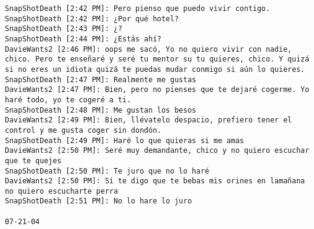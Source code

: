\begin{verbatim}
SnapShotDeath [2:42 PM]: Pero pienso que puedo vivir contigo. 
SnapShotDeath [2:42 PM]: ¿Por qué hotel? 
SnapShotDeath [2:43 PM]: ¿? 
SnapShotDeath [2:44 PM]: ¿Estás ahí? 
DavieWants2 [2:46 PM]: oops me sacó, Yo no quiero vivir con nadie, chico. Pero te enseñaré y seré tu mentor su tu quieres, chico. Y quizá si no eres un idiota quizá te puedas mudar conmigo si aún lo quieres. 
SnapShotDeath [2:47 PM]: Realmente me gustas 
DavieWants2 [2:47 PM]: Bien, pero no pienses que te dejaré cogerme. Yo haré todo, yo te cogeré a ti. 
SnapShotDeath [2:48 PM]: Me gustan los besos 
DavieWants2 [2:49 PM]: Bien, llévatelo despacio, prefiero tener el control y me gusta coger sin dondón. 
SnapShotDeath [2:49 PM]: Haré lo que quieras si me amas 
DavieWants2 [2:50 PM]: Seré muy demandante, chico y no quiero escuchar que te quejes 
SnapShotDeath [2:50 PM]: Te juro que no lo haré 
DavieWants2 [2:50 PM]: Si te digo que te bebas mis orines en lamañana no quiero escucharte perra 
SnapShotDeath [2:51 PM]: No lo hare lo juro

07-21-04


\end{verbatim}

